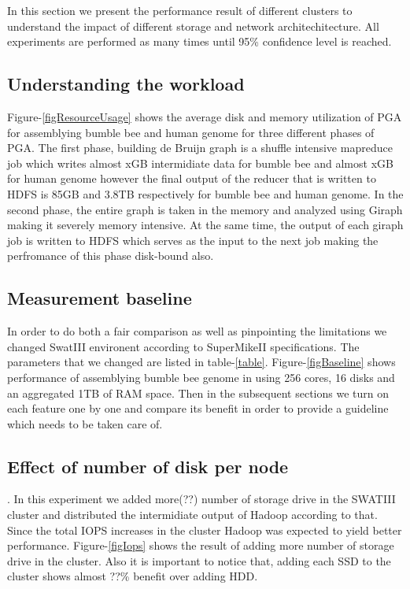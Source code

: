 In this section we present the performance result of different clusters to understand the impact of different storage and network architechitecture.
All experiments are performed as many times until 95\% confidence level is reached.

\subsection {Understanding the workload}
Figure-\ref{figResourceUsage} shows the average disk and memory utilization of PGA for assemblying bumble bee and human genome for three different phases of PGA.
The first phase, building de Bruijn graph is a shuffle intensive mapreduce job which writes almost xGB intermidiate data for bumble bee and almost xGB for human genome however the final output of the reducer that is written to HDFS is 85GB and 3.8TB respectively for bumble bee and human genome.
In the second phase, the entire graph is taken in the memory and analyzed using Giraph making it severely memory intensive.
At the same time, the output of each giraph job is written to HDFS which serves as the input to the next job making the perfromance of this phase disk-bound also.

\subsection {Measurement baseline}
In order to do both a fair comparison as well as pinpointing the limitations we changed SwatIII environent according to SuperMikeII specifications.
The parameters that we changed are listed in table-\ref{table}.
Figure-\ref{figBaseline} shows performance of assemblying bumble bee genome in using 256 cores, 16 disks and an aggregated 1TB of RAM space.
Then in the subsequent sections we turn on each feature one by one and compare its benefit in order to provide a guideline which needs to be taken care of. 

\subsection {Effect of number of disk per node}.
In this experiment we added more(??) number of storage drive in the SWATIII cluster and distributed the intermidiate output of Hadoop according to that.
Since the total IOPS increases in the cluster Hadoop was expected to yield better performance.
Figure-\ref{figIops} shows the result of adding more number of storage drive in the cluster.
Also it is important to notice that, adding each SSD to the cluster shows almost ??\% benefit over adding HDD.

